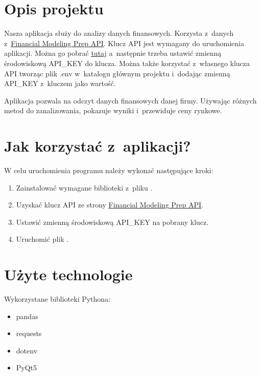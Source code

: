 \documentclass[12pt]{article}
\begin{document}
    \maketitle
    \tableofcontents
    \newpage

    \section{Opis projektu}\label{sec:opis-projektu}
    Nasza aplikacja służy do analizy danych finansowych.
    Korzysta z~danych
	z~\underline{\href{https://site.financialmodelingprep.com/developer/docs/}{Financial Modeling Prep API}}.
    Klucz API jest wymagany do uruchomienia aplikacji.
    Można go pobrać \underline{\href{https://site.financialmodelingprep.com/login}{tutaj}} a~następnie
    trzeba ustawić zmienną środowiskową API\_KEY do klucza.
    Można także korzystać z~własnego klucza API tworząc plik .env w~katalogu głównym projektu
    i~dodając zmienną API\_KEY z~kluczem jako wartość.

    Aplikacja pozwala na odczyt danych finansowych danej firmy.
    Używając różnych metod do zanalizowania, pokazuje wyniki i~przewiduje ceny rynkowe.

    \section{Jak korzystać z~aplikacji?}\label{sec:jak-korzystac-z-aplikacji}
    W celu uruchomienia programu należy wykonać następujące kroki:
    \begin{enumerate}
        \item Zainstalować wymagane biblioteki z~pliku .
        \item Uzyskać klucz API ze strony
        \underline{\href{https://site.financialmodelingprep.com/developer/docs/}{Financial Modeling Prep API}}.
        \item Ustawić zmienną środowiskową API\_KEY na pobrany klucz.
        \item Uruchomić plik .
    \end{enumerate}

    \section{Użyte technologie}\label{sec:uzyte-echnologie}

    Wykorzystane biblioteki Pythona:
    \begin{itemize}
        \item pandas
        \item requests
        \item dotenv
        \item PyQt5
    \end{itemize}
\end{document}
